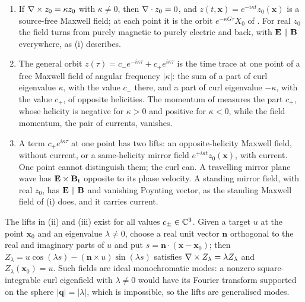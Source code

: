 \begin{proposition}
\label{prop:orbits}
\begin{enumerate}[label=(\roman*),leftmargin=2.2em,itemsep=1pt]
\item If $\nabla\times z_0=\kappa z_0$ with $\kappa\ne0$, then $\nabla\cdot z_0=0$, and $z(t,\mathbf x)=e^{-i\kappa t}z_0(\mathbf x)$ is a source-free
Maxwell field; at each point it is the orbit $e^{-\kappa G\tau}X_0$ of . For real $z_0$ the field turns from purely magnetic
to purely electric and back, with $\mathbf E\parallel\mathbf B$ everywhere, as (i) describes.
\item The general orbit $z(\tau)=c_-e^{-i\kappa\tau}+c_+e^{i\kappa\tau}$ is the time trace at one point of a free Maxwell field of angular
frequency $|\kappa|$: the sum of a part of curl eigenvalue $\kappa$, with the value $c_-$ there, and a part of curl eigenvalue $-\kappa$, with
the value $c_+$, of opposite helicities. The momentum of  measures the part $c_+$, whose helicity is negative for $\kappa>0$
and positive for $\kappa<0$, while the field momentum, the pair of currents, vanishes.
\item A term $c_+e^{i\kappa\tau}$ at one point has two lifts: an opposite-helicity Maxwell field, without current, or a same-helicity
mirror field $e^{+i\kappa t}z_0(\mathbf x)$, with current. One point cannot distinguish them; the curl can. A travelling mirror plane wave
has $\mathbf E\times\mathbf B_{\rm t}$ opposite to its phase velocity. A standing mirror field, with real $z_0$, has $\mathbf E\parallel\mathbf B$ and vanishing
Poynting vector, as the standing Maxwell field of (i) does, and it carries current.
\end{enumerate}
\end{proposition}

The lifts in (ii) and (iii) exist for all values $c_\pm\in\mathbb{C}^3$. Given a target $u$ at the point $\mathbf x_0$ and an eigenvalue
$\lambda\ne0$, choose a real unit vector $\mathbf n$ orthogonal to the real and imaginary parts of $u$ and put $s=\mathbf n\cdot(\mathbf
x-\mathbf x_0)$; then $Z_\lambda=u\cos(\lambda s)-(\mathbf n\times u)\sin(\lambda s)$ satisfies $\nabla\times Z_\lambda=\lambda Z_\lambda$ and
$Z_\lambda(\mathbf x_0)=u$. Such fields are ideal monochromatic modes: a nonzero square-integrable curl eigenfield with $\lambda\ne0$ would have
its Fourier transform supported on the sphere $|\mathbf q|=|\lambda|$, which is impossible, so the lifts are generalised modes.


